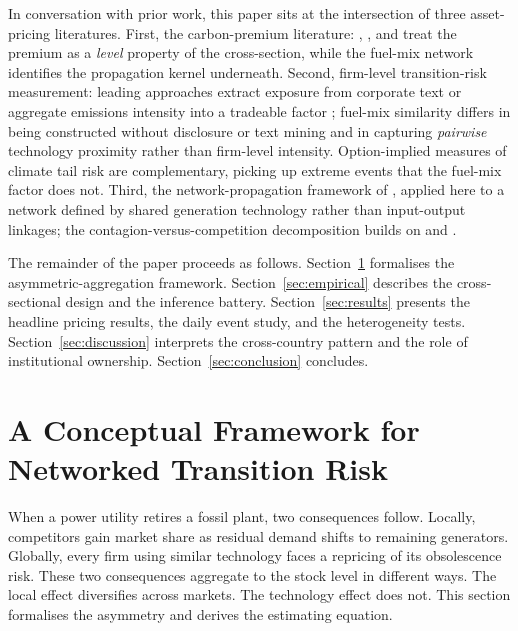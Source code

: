 \documentclass[12pt,a4paper]{article}
\begin{document}
In conversation with prior work, this paper sits at the intersection of three asset-pricing literatures. First, the carbon-premium literature: \citet{BoltonKacperczyk2023}, \citet{PastorStambaughTaylor2022}, and \citet{HsuLiTsou2023} treat the premium as a \emph{level} property of the cross-section, while the fuel-mix network identifies the propagation kernel underneath. Second, firm-level transition-risk measurement: leading approaches extract exposure from corporate text \citep{SautnerVanLentVilkovZhang2023, EngleGiglioKellyLeeStroebel2020} or aggregate emissions intensity into a tradeable factor \citep{GorgenJacobNerlingerRiordanRohlederWilkens2020, PastorStambaughTaylor2021}; fuel-mix similarity differs in being constructed without disclosure or text mining and in capturing \emph{pairwise} technology proximity rather than firm-level intensity. Option-implied measures of climate tail risk \citep{IlhanSautnerVilkov2021} are complementary, picking up extreme events that the fuel-mix factor does not. Third, the network-propagation framework of \citet{AcemogluCarvalhoOzdaglarTahbazSalehi2012}, applied here to a network defined by shared generation technology rather than input-output linkages; the contagion-versus-competition decomposition builds on \citet{LangStulz1992} and \citet{JorionZhang2007}.

The remainder of the paper proceeds as follows. Section~\ref{sec:model} formalises the asymmetric-aggregation framework. Section~\ref{sec:empirical} describes the cross-sectional design and the inference battery. Section~\ref{sec:results} presents the headline pricing results, the daily event study, and the heterogeneity tests. Section~\ref{sec:discussion} interprets the cross-country pattern and the role of institutional ownership. Section~\ref{sec:conclusion} concludes.


\section{A Conceptual Framework for Networked Transition Risk}\label{sec:model}

When a power utility retires a fossil plant, two consequences follow. Locally, competitors gain market share as residual demand shifts to remaining generators. Globally, every firm using similar technology faces a repricing of its obsolescence risk. These two consequences aggregate to the stock level in different ways. The local effect diversifies across markets. The technology effect does not. This section formalises the asymmetry and derives the estimating equation.
\end{document}

